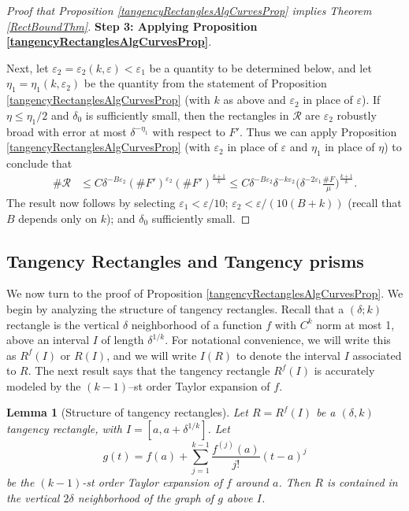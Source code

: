 \documentclass[letterpaper, reqno,11pt]{article}
\numberwithin{equation}{section}
\newcommand{\eps}{\varepsilon}
\numberwithin{thm}{section}
\newtheorem{lem}[thm]{Lemma}
\theoremstyle{remark}
\begin{document}
\begin{proof}[Proof that Proposition \ref{tangencyRectanglesAlgCurvesProp} implies Theorem \ref{RectBoundThm}]
\medskip

\noindent\textbf {Step 3: Applying Proposition \ref{tangencyRectanglesAlgCurvesProp}}.

Next, let $\eps_2=\eps_2(k,\eps)<\eps_1$ be a quantity to be determined below, and let $\eta_1 = \eta_1(k, \eps_2)$ be the quantity from the statement of Proposition \ref{tangencyRectanglesAlgCurvesProp} (with $k$ as above and $\eps_2$ in place of $\eps$). If $\eta\leq\eta_1/2$ and $\delta_0$ is sufficiently small, then the rectangles in $\mathcal{R}$ are $\eps_2$ robustly broad with error at most $\delta^{-\eta_1}$ with respect to $F'$. Thus we can apply Proposition \ref{tangencyRectanglesAlgCurvesProp} (with $\eps_2$ in place of $\eps$ and $\eta_1$ in place of $\eta$) to conclude that 
\begin{equation}\label{finalCompRectBd}
\begin{split}
\#\mathcal{R} & \leq C \delta^{-B \eps_2} (\#F')^{\eps_2} (\# F')^{\frac{k+1}{k}} 
\leq C  \delta^{-B \eps_2} \delta^{-k\eps_2} \Big(\delta^{-2\eps_1}\frac{\#F}{\mu}\Big)^{\frac{k+1}{k}}.
\end{split}
\end{equation}
The result now follows by selecting $\eps_1<\eps/10$; $\eps_2<\eps/(10(B+k))$ (recall that $B$ depends only on $k$); and $\delta_0$ sufficiently small. 
\end{proof}


\subsection{Tangency Rectangles and Tangency prisms}
We now turn to the proof of Proposition \ref{tangencyRectanglesAlgCurvesProp}. We begin by analyzing the structure of tangency rectangles. Recall that a $(\delta;k)$ rectangle is the vertical $\delta$ neighborhood of a function $f$ with $C^k$ norm at most 1, above an interval $I$ of length $\delta^{1/k}$. For notational convenience, we will write this as $R^f(I)$ or $R(I)$, and we will write $I(R)$ to denote the interval $I$ associated to $R$. The next result says that the tangency rectangle $R^f(I)$ is accurately modeled by the $(k-1)$--st order Taylor expansion of $f$.

\begin{lem}[Structure of tangency rectangles]\label{tangencyRectStructure}
Let $R=R^f(I)$ be a $(\delta,k)$ tangency rectangle, with $I = [a, a+\delta^{1/k}]$. Let 
\[
g(t) = f(a)+ \sum_{j=1}^{k-1}\frac{f^{(j)}(a)}{j!}(t-a)^j
\] 
be the $(k-1)$-st order Taylor expansion of $f$ around $a$. Then $R$ is contained in the vertical $2\delta$ neighborhood of the graph of $g$ above $I$.
\end{lem}
\end{document}
